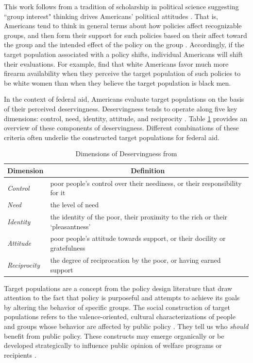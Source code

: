 \documentclass[12pt]{article}%
\begin{document}
\begin{doublespace}
This work follows from a tradition of scholarship in political science suggesting ``group interest" thinking drives Americans' political attitudes \citep{converse1946}. That is, Americans tend to think in general terms about how policies affect recognizable groups, and then form their support for such policies based on their affect toward the group and the intended effect of the policy on the group \citep{winter2008dangerous, theiss2009counts, huddy2004contrasting, iyengar2012affect}. Accordingly, if the target population associated with a policy shifts, individual Americans will shift their evaluations. For example, \cite{hayes2021race} find that white Americans favor much more firearm availability when they perceive the target population of such policies to be white women than when they believe the target population is black men. 

In the context of federal aid, Americans evaluate target populations on the basis of their perceived deservingness. Deservingness tends to operate along five key dimensions: control, need, identity, attitude, and reciprocity \citep{van_oorschot_who_nodate}. Table \ref{one} provides an overview of these components of deservingness. Different combinations of these criteria often underlie the constructed target populations for federal aid. 

\begin{table}[!h]
	\caption{Dimensions of Deservingness from \cite{van_oorschot_who_nodate}} 
	\label{one}
	\begin{tabular}{l|l}
		\textbf{Dimension}    & \multicolumn{1}{c}{\textbf{Definition}}                                       \\ \hline
		\textit{Control}     & poor people’s control over their neediness, or their responsibility for it    \\
		\textit{Need}        & the level of need                                                             \\
		\textit{Identity}    & the identity of the poor, their proximity to the rich or their ‘pleasantness’ \\
		\textit{Attitude}    & poor people’s attitude towards support, or their docility or gratefulness     \\
		\textit{Reciprocity} & the degree of reciprocation by the poor, or having earned support            
	\end{tabular}
\end{table}


Target populations are a concept from the policy design literature that draw attention to the fact that policy is purposeful and attempts to achieve its goals by altering the behavior of specific groups. The social construction of target populations refers to the valence-oriented, cultural characterizations of people and groups whose behavior are affected by public policy \citep{schneider_social_1993, schneider2005deserving}. They tell us who \textit{should} benefit from public policy. These constructs may emerge organically or be developed strategically to influence public opinion of welfare programs or recipients \citep{ingram1993constructing}. 


\end{doublespace}
\end{document}
